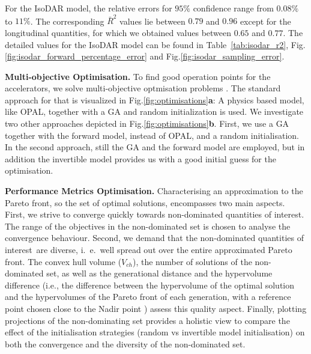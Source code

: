 \documentclass[a4paper, 12pt, version-1-compatibility]{article}
\def\qois{quantities of interest}
\newcommand{\figref}[1]{Fig.\xspace\ref{#1}}
\newcommand{\tabref}[1]{Table~\ref{#1}}
\begin{document}
For the IsoDAR model, the relative errors for $95\%$ confidence range from $0.08\%$ to $11\%$.
The corresponding $\bar{R}^2$ values lie between $0.79$ and $0.96$ except for the longitudinal quantities, for which we obtained values between $0.65$ and $0.77$.
The detailed values for the IsoDAR model can be found in \tabref{tab:isodar_r2}, \figref{fig:isodar_forward_percentage_error} and \figref{fig:isodar_sampling_error}.  

{\bf Multi-objective Optimisation.}
To find good operation points for the accelerators, we solve multi-objective optmisation problems \cite{PhysRevAccelBeams.20.033401,PhysRevAccelBeams.22.054602,ml_speedup,bazarov}. The standard approach for that is visualized in \figref{fig:optimisations}{\bf{a}}: A physics based model, like OPAL, together with a GA and random initialization is used. We investigate two other approaches depicted in  \figref{fig:optimisations}{\bf{b}}. First, we use a GA together with the forward model, instead of OPAL, and a random initialisation. In the second approach, still the GA and the forward model are employed, but in addition the invertible model provides us with a good initial guess for the optimisation. 

{\bf Performance Metrics Optimisation.} Characterising an approximation to the Pareto front, so the set of optimal solutions,  encompasses two main aspects. First, we strive to converge quickly towards non-dominated \qois. The range of the objectives in the non-dominated set is chosen to analyse the convergence behaviour. Second, we demand that the non-dominated \qois\ are diverse, i.\ e.\, well spread out over the entire approximated Pareto front. The convex hull volume ($V_{ch}$), the number of solutions of the non-dominated set, as well as the generational distance \cite{Veldhuizen99multiobjectiveevolutionary} and the hypervolume difference (i.e., the difference between the hypervolume of the optimal solution and the hypervolumes of the Pareto front of each generation, with a reference point chosen close to the Nadir point \cite{Fonseca_2006}) assess this quality aspect. Finally, plotting projections of the non-dominating set provides a holistic view to compare the effect of the initialisation strategies (random vs invertible model initialisation) on both the convergence and the diversity of the non-dominated set.
\end{document}
